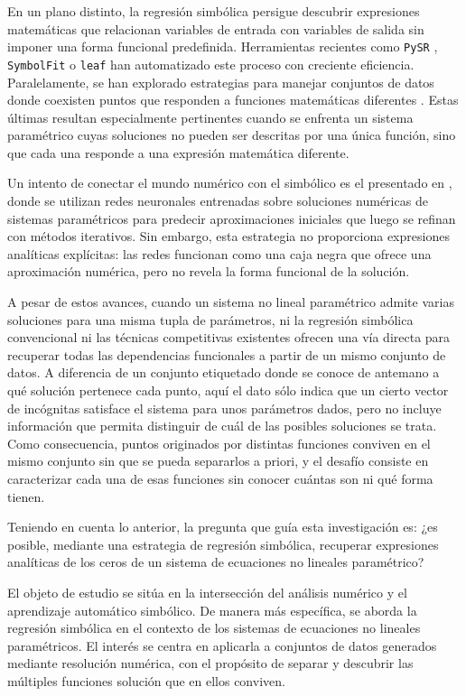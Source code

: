 \documentclass{article} \usepackage[utf8]{inputenc} \usepackage[spanish]{babel} \usepackage{amsmath, amssymb, amsthm} \usepackage{bm} \usepackage{float} \usepackage{longtable} \usepackage[hidelinks]{hyperref}
\begin{document}
En un plano distinto, la regresión simbólica \cite{koza1992genetic} persigue descubrir expresiones matemáticas que relacionan variables de entrada con variables de salida sin imponer una forma funcional predefinida.  Herramientas recientes como \texttt{PySR} \cite{cranmer2023pysr}, \texttt{SymbolFit} \cite{diniz2025symbolfit} o \texttt{leaf} \cite{leaf2024} han automatizado este proceso con creciente eficiencia.  Paralelamente, se han explorado estrategias para manejar conjuntos de datos donde coexisten puntos que responden a funciones matemáticas diferentes \cite{ukorigho2023competitive}.  Estas últimas resultan especialmente pertinentes cuando se enfrenta un sistema paramétrico cuyas soluciones no pueden ser descritas por una única función, sino que cada una responde a una expresión matemática diferente.

Un intento de conectar el mundo numérico con el simbólico es el presentado en \cite{merlet2024mixing}, donde se utilizan redes neuronales entrenadas sobre soluciones numéricas de sistemas paramétricos para predecir aproximaciones iniciales que luego se refinan con métodos iterativos.  Sin embargo, esta estrategia no proporciona expresiones analíticas explícitas: las redes funcionan como una caja negra que ofrece una aproximación numérica, pero no revela la forma funcional de la solución.

A pesar de estos avances, cuando un sistema no lineal paramétrico admite varias soluciones para una misma tupla de parámetros, ni la regresión simbólica convencional ni las técnicas competitivas existentes ofrecen una vía directa para recuperar todas las dependencias funcionales a partir de un mismo conjunto de datos.  A diferencia de un conjunto etiquetado donde se conoce de antemano a qué solución pertenece cada punto, aquí el dato sólo indica que un cierto vector de incógnitas satisface el sistema para unos parámetros dados, pero no incluye información que permita distinguir de cuál de las posibles soluciones se trata.  Como consecuencia, puntos originados por distintas funciones conviven en el mismo conjunto sin que se pueda separarlos a priori, y el desafío consiste en caracterizar cada una de esas funciones sin conocer cuántas son ni qué forma tienen.

Teniendo en cuenta lo anterior, la pregunta que guía esta investigación es: ¿es posible, mediante una estrategia de regresión simbólica, recuperar expresiones analíticas de los ceros de un sistema de ecuaciones no lineales paramétrico?

El objeto de estudio se sitúa en la intersección del análisis numérico y el aprendizaje automático simbólico.  De manera más específica, se aborda la regresión simbólica en el contexto de los sistemas de ecuaciones no lineales paramétricos.  El interés se centra en aplicarla a conjuntos de datos generados mediante resolución numérica, con el propósito de separar y descubrir las múltiples funciones solución que en ellos conviven.
\end{document}

